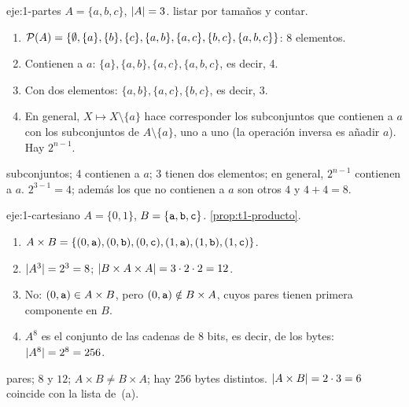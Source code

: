 \begin{solucion}{eje:1-partes}
\datos $A=\{a,b,c\}$, $\lvert A\rvert=3$.
\planteamiento listar por tamaños y contar.
\pasos
\begin{enumerate}[label=\arabic*.]
  \item $\mathcal{P}(A)=\{\emptyset,\{a\},\{b\},\{c\},\{a,b\},\{a,c\},\{b,c\},\{a,b,c\}\}$: 8 elementos.
  \item Contienen a $a$: $\{a\},\{a,b\},\{a,c\},\{a,b,c\}$, es decir, 4.
  \item Con dos elementos: $\{a,b\},\{a,c\},\{b,c\}$, es decir, 3.
  \item En general, $X\mapsto X\setminus\{a\}$ hace corresponder los subconjuntos que contienen a $a$ con los subconjuntos de $A\setminus\{a\}$, uno a uno (la operación inversa es añadir $a$). Hay $2^{n-1}$.
\end{enumerate}
 subconjuntos; 4 contienen a $a$; 3 tienen dos elementos; en general, $2^{n-1}$ contienen a $a$.
\comprobacion $2^{3-1}=4$; además los que no contienen a $a$ son otros $4$ y $4+4=8$.
\end{solucion}

\begin{solucion}{eje:1-cartesiano}
\datos $A=\{0,1\}$, $B=\{\texttt{a},\texttt{b},\texttt{c}\}$.
\planteamiento \cref{prop:t1-producto}.
\pasos
\begin{enumerate}[label=(\alph*)]
  \item $A\times B=\{(0,\texttt{a}),(0,\texttt{b}),(0,\texttt{c}),(1,\texttt{a}),(1,\texttt{b}),(1,\texttt{c})\}$.
  \item $\lvert A^{3}\rvert=2^{3}=8$; $\lvert B\times A\times A\rvert=3\cdot2\cdot2=12$.
  \item No: $(0,\texttt{a})\in A\times B$, pero $(0,\texttt{a})\notin B\times A$, cuyos pares tienen primera componente en $B$.
  \item $A^{8}$ es el conjunto de las cadenas de 8 bits, es decir, de los bytes: $\lvert A^{8}\rvert=2^{8}=256$.
\end{enumerate}
 pares; $8$ y $12$; $A\times B\neq B\times A$; hay $256$ bytes distintos.
\comprobacion $\lvert A\times B\rvert=2\cdot3=6$ coincide con la lista de~(a).
\end{solucion}

